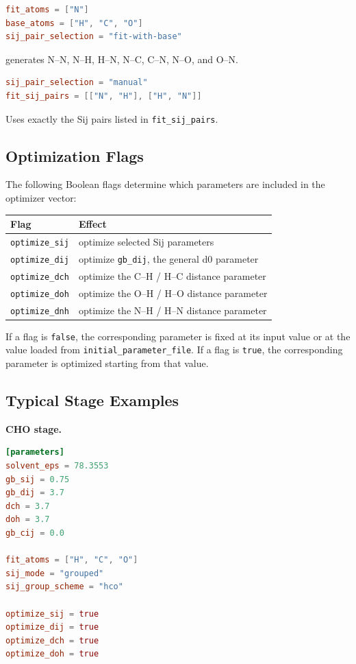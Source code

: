 \documentclass[11pt]{article}
\begin{document}
\begin{lstlisting}[language=toml]
fit_atoms = ["N"]
base_atoms = ["H", "C", "O"]
sij_pair_selection = "fit-with-base"
\end{lstlisting}

generates N--N, N--H, H--N, N--C, C--N, N--O, and O--N.

\begin{lstlisting}[language=toml]
sij_pair_selection = "manual"
fit_sij_pairs = [["N", "H"], ["H", "N"]]
\end{lstlisting}

Uses exactly the Sij pairs listed in \texttt{fit\_sij\_pairs}.

\subsection{Optimization Flags}

The following Boolean flags determine which parameters are included in the
optimizer vector:

\begin{center}
\begin{tabular}{ll}
\toprule
Flag & Effect \\
\midrule
\texttt{optimize\_sij} & optimize selected Sij parameters \\
\texttt{optimize\_dij} & optimize \texttt{gb\_dij}, the general d0 parameter \\
\texttt{optimize\_dch} & optimize the C--H / H--C distance parameter \\
\texttt{optimize\_doh} & optimize the O--H / H--O distance parameter \\
\texttt{optimize\_dnh} & optimize the N--H / H--N distance parameter \\
\bottomrule
\end{tabular}
\end{center}

If a flag is \texttt{false}, the corresponding parameter is fixed at its input
value or at the value loaded from \texttt{initial\_parameter\_file}. If a flag is
\texttt{true}, the corresponding parameter is optimized starting from that
value.

\subsection{Typical Stage Examples}

\textbf{CHO stage.}

\begin{lstlisting}[language=toml]
[parameters]
solvent_eps = 78.3553
gb_sij = 0.75
gb_dij = 3.7
dch = 3.7
doh = 3.7
gb_cij = 0.0

fit_atoms = ["H", "C", "O"]
sij_mode = "grouped"
sij_group_scheme = "hco"

optimize_sij = true
optimize_dij = true
optimize_dch = true
optimize_doh = true
\end{lstlisting}
\end{document}
